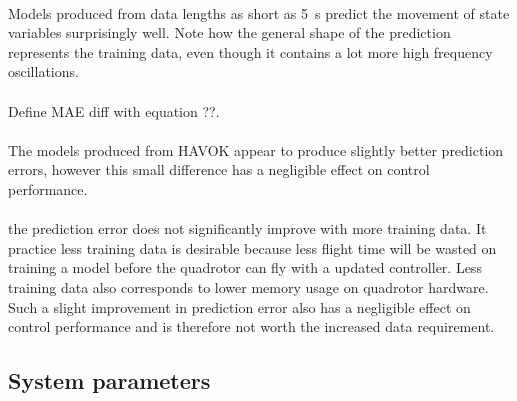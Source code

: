         \paragraph{}
        Models produced from data lengths as short as \SI{5}{\second} predict the movement of state variables surprisingly well.
        Note how the general shape of the prediction represents the training data, 
        even though it contains a lot more high frequency oscillations.

        

        \paragraph{}
        Define MAE diff with equation ??.

        \paragraph{}
        The models produced from HAVOK appear to produce slightly better prediction errors, however this small difference has a negligible effect on control performance.

        \paragraph{}
        the prediction error does not significantly improve with more training data.
        It practice less training data is desirable because less flight time will be wasted on training a model before the quadrotor can fly with a updated controller.
        Less training data also corresponds to lower memory usage on quadrotor hardware.
        Such a slight improvement in prediction error also has a negligible effect on control performance and is therefore not worth the increased data requirement.


    \subsection{System parameters}
            
